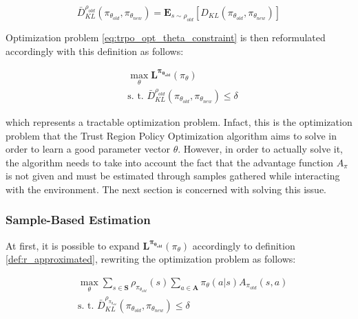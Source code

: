                 \begin{definition}
                    \label{def:avg_kl_div}
                    \[ \bar{D}^{\rho_{old}}_{KL} (\pi_{\theta_{old}}, \pi_{\theta_{new}}) = \mathbf{E}_{s\sim\rho_{old}} \left[ D_{KL} (\pi_{\theta_{old}}, \pi_{\theta_{new}}) \right]\]
                \end{definition}
                
                Optimization problem \ref{eq:trpo_opt_theta_constraint} is then reformulated accordingly with this definition as follows:
                
                \begin{align}
                    \label{eq:trpo_opt_theta_avgkl}
                    &\max_{\theta} \mathbf{L^{\pi_{\theta_{old}}}}(\pi_{\theta}) \\
                    &\text{s. t. } \bar{D}^{\rho_{old}}_{KL} (\pi_{\theta_{old}}, \pi_{\theta_{new}}) \leq \delta \nonumber
                \end{align}
                
                which represents a tractable optimization problem. Infact, this is the optimization problem that the Trust Region Policy Optimization algorithm aims to solve in order to learn a good parameter vector $\theta$. However, in order to actually solve it, the algorithm needs to take into account the fact that the advantage function $A_\pi$ is not given and must be estimated through samples gathered while interacting with the environment. The next section is concerned with solving this issue.
                
            \subsubsection{Sample-Based Estimation}
                At first, it is possible to expand $\mathbf{L^{\pi_{\theta_{old}}}}(\pi_{\theta})$ accordingly to definition \ref{def:r_approximated}, rewriting the optimization problem as follows:
                
                \begin{align}
                    \label{eq:trpo_opt_L_expanded}
                    &\max_{\theta} \sum_{s \in \mathbf{S}} \rho_{\pi_{\theta_{old}}}(s) \sum_{a \in \mathbf{A}} \pi_{\theta}(a|s) A_{\pi_{old}}(s, a) \\
                    &\text{s. t. } \bar{D}^{\rho_{\pi_{\theta_{old}}}}_{KL} (\pi_{\theta_{old}}, \pi_{\theta_{new}}) \leq \delta \nonumber
                \end{align}
                
